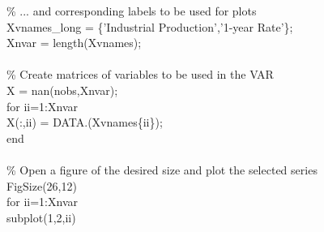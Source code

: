 \hspace{1mm}\textcolor{matlabgreen}{\% ... and corresponding labels to be used \textcolor{matlabblue}{for} plots }\\ 
\hspace{1mm}\hspace{5mm} Xvnames\_long = \{\textcolor{matlabpurple}{'Industrial Production'},\textcolor{matlabpurple}{'1-year Rate'}\}; \\ 
\hspace{1mm}\hspace{5mm} Xnvar        = length(Xvnames); \\ 
\hspace{1mm}\hspace{5mm}  \\ 
\hspace{1mm}\hspace{5mm} \textcolor{matlabgreen}{\% Create matrices of variables to be used in the VAR }\\ 
\hspace{1mm}\hspace{5mm} X = nan(nobs,Xnvar); \\ 
\hspace{1mm}\hspace{5mm} \textcolor{matlabblue}{for} ii=1:Xnvar \\ 
\hspace{1mm}\hspace{5mm} \hspace{5mm} X(:,ii) = DATA.(Xvnames\{ii\}); \\ 
\hspace{1mm}\hspace{5mm} \textcolor{matlabblue}{end} \\ 
\hspace{1mm}\hspace{5mm}  \\ 
\hspace{1mm}\hspace{5mm} \textcolor{matlabgreen}{\% Open a figure of the desired size and plot the selected series }\\ 
\hspace{1mm}\hspace{5mm} FigSize(26,12) \\ 
\hspace{1mm}\hspace{5mm} \textcolor{matlabblue}{for} ii=1:Xnvar \\ 
\hspace{1mm}\hspace{5mm} \hspace{5mm} subplot(1,2,ii) \\ 
